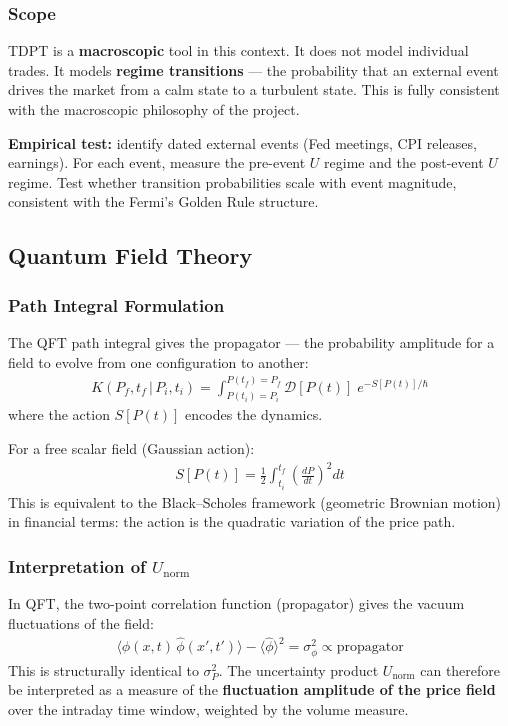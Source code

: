 \documentclass[11pt]{article}
\begin{document}
\subsubsection{Scope}

TDPT is a \textbf{macroscopic} tool in this context. It does not model individual trades. It models \textbf{regime transitions} — the probability that an external event drives the market from a calm state to a turbulent state. This is fully consistent with the macroscopic philosophy of the project.

\textbf{Empirical test:} identify dated external events (Fed meetings, CPI releases, earnings). For each event, measure the pre-event $U$ regime and the post-event $U$ regime. Test whether transition probabilities scale with event magnitude, consistent with the Fermi's Golden Rule structure.

\subsection{Quantum Field Theory}

\subsubsection{Path Integral Formulation}

The QFT path integral gives the propagator --- the probability amplitude for a field to evolve from one configuration to another:
\begin{align}
    K(P_f, t_f\,|\, P_i, t_i) = \int_{P(t_i)=P_i}^{P(t_f)=P_f} \mathcal{D}[P(t)]\; e^{-S[P(t)]/\hbar}
\end{align}
where the action $S[P(t)]$ encodes the dynamics.

For a free scalar field (Gaussian action):
\begin{align}
    S[P(t)] = \frac{1}{2} \int_{t_i}^{t_f} \left(\frac{dP}{dt}\right)^2 dt
\end{align}
This is equivalent to the Black--Scholes framework (geometric Brownian motion) in financial terms: the action is the quadratic variation of the price path.

\subsubsection{Interpretation of $U_\mathrm{norm}$}

In QFT, the two-point correlation function (propagator) gives the vacuum fluctuations of the field:
\begin{align}
    \langle \hat{\phi}(x,t)\, \hat{\phi}(x',t') \rangle - \langle \hat{\phi} \rangle^2 = \sigma^2_\phi \propto \text{propagator}
\end{align}
This is structurally identical to $\sigma_P^2$. The uncertainty product $U_\mathrm{norm}$ can therefore be interpreted as a measure of the \textbf{fluctuation amplitude of the price field} over the intraday time window, weighted by the volume measure.
\end{document}
